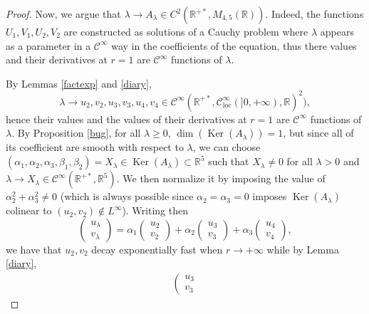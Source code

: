 \documentclass[11 pt]{amsart}
\newcommand{\nin}{\not\in}
\newcommand{\tmop}[1]{\ensuremath{\operatorname{#1}}}
\theoremstyle{definition}
\theoremstyle{remark}
\numberwithin{equation}{section}
\begin{document}
\begin{proof}
  Now, we argue that $\lambda \rightarrow A_{\lambda} \in C^2 (\mathbb{R}^{+
  \ast}, M_{4, 5} (\mathbb{R}))$. Indeed, the functions $U_1, V_1, U_2, V_2$
  are constructed as solutions of a Cauchy problem where $\lambda$ appears as
  a parameter in a $\mathcal{C}^\infty$ way in the coefficients of the equation, thus
  there values and their derivatives at $r = 1$ are $\mathcal{C}^\infty$ functions of
  $\lambda$.
  
  By Lemmas \ref{factexp} and \ref{diary},
  \[ \lambda \rightarrow u_2, v_2, u_3, v_3, u_4, v_4 \in \mathcal{C}^\infty
     (\mathbb{R}^{+ \ast}, \mathcal{C}^\infty_{\tmop{loc}} (] 0, + \infty ),
     \mathbb{R})^2), \]
  hence their values and the values of their derivatives at $r = 1$ are
  $\mathcal{C}^\infty$ functions of $\lambda$. By Proposition \ref{bug}, for all
  $\lambda \geqslant 0$, $\dim (\tmop{Ker} (A_{\lambda})) = 1$, but since all
  of its coefficient are smooth with respect to $\lambda$, we can choose
  $(\alpha_1, \alpha_2, \alpha_3, \beta_1, \beta_2) = X_{\lambda} \in
  \tmop{Ker} (A_{\lambda}) \subset \mathbb{R}^5$ such that $X_{\lambda} \neq
  0$ for all $\lambda > 0$ and $\lambda \rightarrow X_{\lambda} \in \mathcal{C}^\infty
  (\mathbb{R}^{+ \ast}, \mathbb{R}^5)$. We then normalize it by imposing the
  value of $\alpha_2^2 + \alpha_3^2 \neq 0$ (which is always possible since
  $\alpha_2 = \alpha_3 = 0$ imposes $\tmop{Ker} (A_{\lambda})$ colinear to
  $(u_2, v_2) \nin L^{\infty}$). Writing then
  \[ \left(\begin{array}{c}
       u_{\lambda}\\
       v_{\lambda}
     \end{array}\right) = \alpha_1 \left(\begin{array}{c}
       u_2\\
       v_2
     \end{array}\right) + \alpha_2 \left(\begin{array}{c}
       u_3\\
       v_3
     \end{array}\right) + \alpha_3 \left(\begin{array}{c}
       u_4\\
       v_4
     \end{array}\right), \]
  we have that $u_2, v_2$ decay exponentially fast when $r \rightarrow +
  \infty$ while by Lemma \ref{diary},
  \begin{align*}
\left(\begin{array}{c}
      u_3\\
      v_3

\end{array}
\end{align*}
\end{proof}
\end{document}
